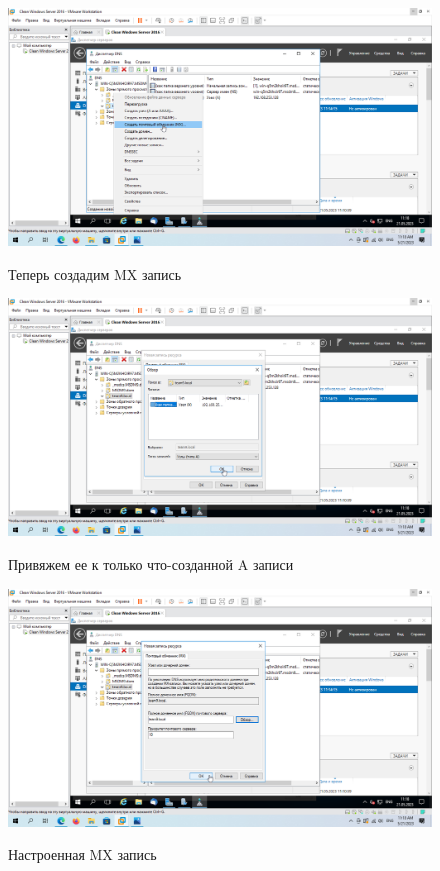 \documentclass[a4paper]{article}
\begin{document}
  \begin{figure}[H]
    \centering
    \includegraphics[width=\textwidth]{11_0090}
    \label{img:90}
    \caption{Теперь создадим MX запись}
  \end{figure}

  \begin{figure}[H]
    \centering
    \includegraphics[width=\textwidth]{11_0091}
    \label{img:91}
    \caption{Привяжем ее к только что-созданной A записи}
  \end{figure}

  \begin{figure}[H]
    \centering
    \includegraphics[width=\textwidth]{11_0092}
    \label{img:92}
    \caption{Настроенная MX запись}
  \end{figure}
\end{document}
